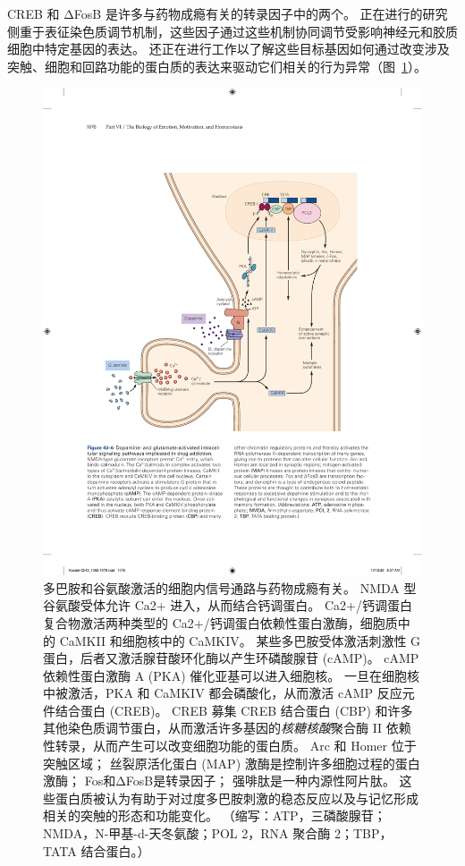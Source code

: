 CREB 和 ΔFosB 是许多与药物成瘾有关的转录因子中的两个。
正在进行的研究侧重于表征染色质调节机制，这些因子通过这些机制协同调节受影响神经元和胶质细胞中特定基因的表达。
还正在进行工作以了解这些目标基因如何通过改变涉及突触、细胞和回路功能的蛋白质的表达来驱动它们相关的行为异常（图~\ref{fig:43_6}）。


\begin{figure}[htbp]
	\centering
	\includegraphics[width=0.8\linewidth]{chap43/fig_43_6}
	\caption{多巴胺和谷氨酸激活的细胞内信号通路与药物成瘾有关。 NMDA 型谷氨酸受体允许 Ca2+ 进入，从而结合钙调蛋白。 Ca2+/钙调蛋白复合物激活两种类型的 Ca2+/钙调蛋白依赖性蛋白激酶，细胞质中的 CaMKII 和细胞核中的 CaMKIV。 某些多巴胺受体激活刺激性 G 蛋白，后者又激活腺苷酸环化酶以产生环磷酸腺苷 (cAMP)。 cAMP 依赖性蛋白激酶 A (PKA) 催化亚基可以进入细胞核。 一旦在细胞核中被激活，PKA 和 CaMKIV 都会磷酸化，从而激活 cAMP 反应元件结合蛋白 (CREB)。 CREB 募集 CREB 结合蛋白 (CBP) 和许多其他染色质调节蛋白，从而激活许多基因的\textit{核糖核酸}聚合酶 II 依赖性转录，从而产生可以改变细胞功能的蛋白质。 Arc 和 Homer 位于突触区域； 丝裂原活化蛋白 (MAP) 激酶是控制许多细胞过程的蛋白激酶； Fos和ΔFosB是转录因子； 强啡肽是一种内源性阿片肽。 这些蛋白质被认为有助于对过度多巴胺刺激的稳态反应以及与记忆形成相关的突触的形态和功能变化。 （缩写：ATP，三磷酸腺苷；NMDA，N-甲基-d-天冬氨酸；POL 2，RNA 聚合酶 2；TBP，TATA 结合蛋白。）}
	\label{fig:43_6}
\end{figure}



